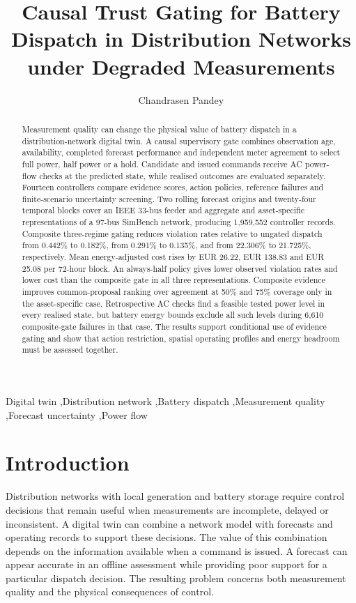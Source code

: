 \documentclass[preprint,12pt]{elsarticle}
\begin{document}
\begin{frontmatter}
\title{Causal Trust Gating for Battery Dispatch in Distribution Networks under Degraded Measurements}
\author[upes]{Chandrasen Pandey}
\begin{abstract}
Measurement quality can change the physical value of battery dispatch in a distribution-network digital twin. A causal supervisory gate combines observation age, availability, completed forecast performance and independent meter agreement to select full power, half power or a hold. Candidate and issued commands receive AC power-flow checks at the predicted state, while realised outcomes are evaluated separately. Fourteen controllers compare evidence scores, action policies, reference failures and finite-scenario uncertainty screening. Two rolling forecast origins and twenty-four temporal blocks cover an IEEE 33-bus feeder and aggregate and asset-specific representations of a 97-bus SimBench network, producing 1,959,552 controller records. Composite three-regime gating reduces violation rates relative to ungated dispatch from 0.442\% to 0.182\%, from 0.291\% to 0.135\%, and from 22.306\% to 21.725\%, respectively. Mean energy-adjusted cost rises by EUR 26.22, EUR 138.83 and EUR 25.08 per 72-hour block. An always-half policy gives lower observed violation rates and lower cost than the composite gate in all three representations. Composite evidence improves common-proposal ranking over agreement at 50\% and 75\% coverage only in the asset-specific case. Retrospective AC checks find a feasible tested power level in every realised state, but battery energy bounds exclude all such levels during 6,610 composite-gate failures in that case. The results support conditional use of evidence gating and show that action restriction, spatial operating profiles and energy headroom must be assessed together.
\end{abstract}
\begin{keyword}
Digital twin \sep Distribution network \sep Battery dispatch \sep Measurement quality \sep Forecast uncertainty \sep Power flow
\end{keyword}
\end{frontmatter}
\section{Introduction}\label{sec:intro}
Distribution networks with local generation and battery storage require control decisions that remain useful when measurements are incomplete, delayed or inconsistent. A digital twin can combine a network model with forecasts and operating records to support these decisions. The value of this combination depends on the information available when a command is issued. A forecast can appear accurate in an offline assessment while providing poor support for a particular dispatch decision. The resulting problem concerns both measurement quality and the physical consequences of control.
\end{document}
